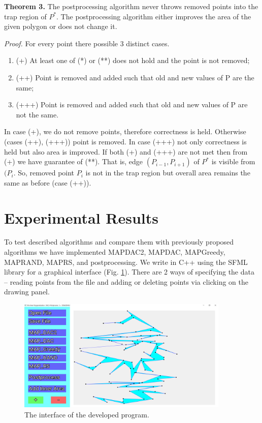 \documentclass[conference]{IEEEtran}
\begin{document}
			\textbf{Theorem 3.}
			The postprocessing algorithm never throws removed points into the trap region of $P^{*}$.
			The postprocessing algorithm either improves the area of the given polygon or does not change it.
			
			\textit{Proof.}
			For every point there possible 3 distinct cases.
			\begin{enumerate}
				\item (+) At least one of (*) or (**) does not hold and the point is not removed;
				\item (++) Point is removed and added such that old and new values of P are the same;
				\item (+++) Point is removed and added such that old and new values of P are not the same.
			\end{enumerate}
			
			In case (+), we do not remove points, therefore correctness is held.
			Otherwise (cases (++), (+++)) point is removed.
			In case (+++) not only correctness is held but also area is improved.
			If both (+) and (+++) are not met then from (+) we have guarantee of (**).
			That is, edge $(P_{i-1}, P_{i+1})$ of $P^{*}$ is visible from $(P_{i}$.
			So, removed point $P_{i}$ is not in the trap region but overall area remains the same as before (case (++)).
	
	\section{Experimental Results}
	\label{S4}
		To test described algorithms and compare them with previously proposed algorithms we have implemented MAP{\textunderscore}DAC2, MAP{\textunderscore}DAC, MAP{\textunderscore}Greedy, MAP{\textunderscore}RAND, MAP{\textunderscore}RS, and postprocessing.
		We write in C++ using the SFML library for a graphical interface (Fig. \ref{fig4}).
		There are 2 ways of specifying the data – reading points from the file and adding or deleting points via clicking on the drawing panel.
		
		\begin{figure}[htbp]
			\centerline{\includegraphics[width=0.9\textwidth]{fig4.png}}
			\caption{The interface of the developed program.}
			\label{fig4}
		\end{figure}
		
\end{document}
